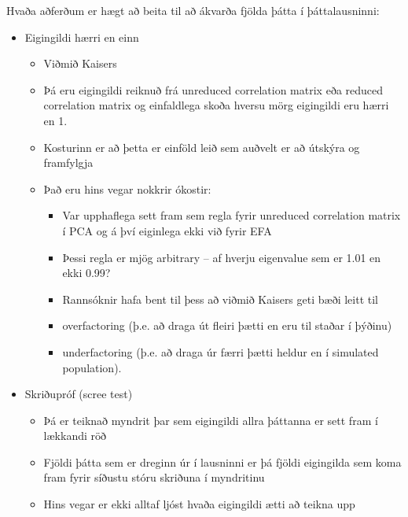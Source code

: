 \documentclass[]{book}
\providecommand{\tightlist}{%
  \setlength{\itemsep}{0pt}\setlength{\parskip}{0pt}}
\begin{document}
Hvaða aðferðum er hægt að beita til að ákvarða fjölda þátta í þáttalausninni:

\begin{itemize}
\tightlist
\item
  Eigingildi hærri en einn

  \begin{itemize}
  \tightlist
  \item
    Viðmið Kaisers
  \item
    Þá eru eigingildi reiknuð frá unreduced correlation matrix eða reduced correlation matrix og
    einfaldlega skoða hversu mörg eigingildi eru hærri en 1.
  \item
    Kosturinn er að þetta er einföld leið sem auðvelt er að útskýra og framfylgja
  \item
    Það eru hins vegar nokkrir ókostir:

    \begin{itemize}
    \tightlist
    \item
      Var upphaflega sett fram sem regla fyrir unreduced correlation matrix í PCA og á því
      eiginlega ekki við fyrir EFA
    \item
      Þessi regla er mjög arbitrary -- af hverju eigenvalue sem er 1.01 en ekki 0.99?
    \item
      Rannsóknir hafa bent til þess að viðmið Kaisers geti bæði leitt til
    \item
      overfactoring (þ.e. að draga út fleiri þætti en eru til staðar í þýðinu)
    \item
      underfactoring (þ.e. að draga úr færri þætti heldur en í simulated population).
    \end{itemize}
  \end{itemize}
\item
  Skriðupróf (scree test)

  \begin{itemize}
  \tightlist
  \item
    Þá er teiknað myndrit þar sem eigingildi allra þáttanna er sett fram í lækkandi röð
  \item
    Fjöldi þátta sem er dreginn úr í lausninni er þá fjöldi eigingilda sem koma fram fyrir síðustu stóru skriðuna í myndritinu
  \item
    Hins vegar er ekki alltaf ljóst hvaða eigingildi ætti að teikna upp


\end{itemize}
\end{itemize}
\end{document}
